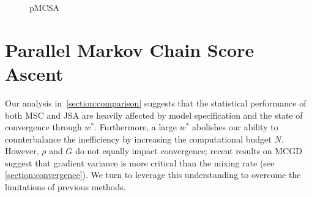 
%
\begin{wrapfigure}[12]{r}{0.43\textwidth}
\vspace{-7ex}
\begin{minipage}[c]{0.43\textwidth}
  \begin{algorithm2e}[H]
    \DontPrintSemicolon
    \SetAlgoLined
    \caption{pMCSA}\label{alg:pmcsa}
  \end{algorithm2e}
\end{minipage}
\end{wrapfigure}
%
\vspace{-1.ex}
\section{Parallel Markov Chain Score Ascent}\label{section:pmcsa}
\vspace{-1.ex}
Our analysis in~\cref{section:comparison} suggests that the statistical performance of both MSC and JSA are heavily affected by model specification and the state of convergence through \(w^*\).
Furthermore, a large \(w^*\) abolishes our ability to counterbalance the inefficiency by increasing the computational budget \(N\).
However, \(\rho\) and \(G\) do not equally impact convergence; recent results on MCGD suggest that gradient variance is more critical than the mixing rate (see \cref{section:convergence}).
We turn to leverage this understanding to overcome the limitations of previous methods.

\vspace{-1.ex}
